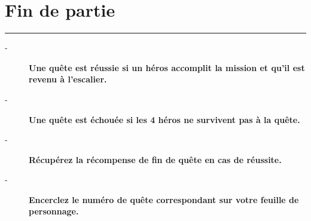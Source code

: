 \documentclass{scrartcl}%
\begin{document}
%
\section{ Fin de partie
}%
\label{sec:Findepartie}%
\rule{18cm}{0.07cm}\break%
\begin{description}%
\item[{-} ]%
%
\textbf{Une quête est réussie si un héros accomplit la mission et qu'il est revenu à l'escalier.}%

%
\item[{-} ]%
%
\textbf{Une quête est échouée si les 4 héros ne survivent pas à la quête.}%

%
\item[{-} ]%
%
\textbf{Récupérez la récompense de fin de quête en cas de réussite.}%

%
\item[{-} ]%
%
\textbf{Encerclez le numéro de quête correspondant sur votre feuille de personnage.}%
\end{description}

%
\end{document}
